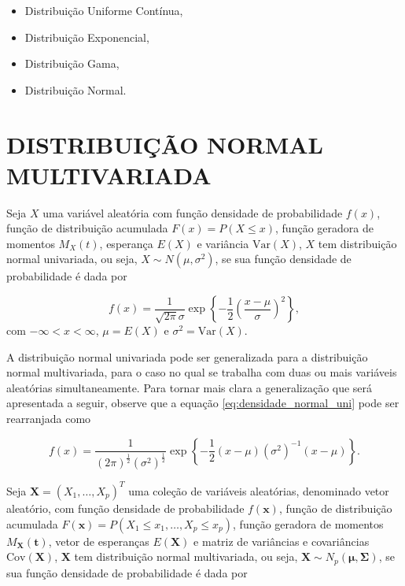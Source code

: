 \begin{itemize}
    \item Distribuição Uniforme Contínua,
    \item Distribuição Exponencial,
    \item Distribuição Gama,
    \item Distribuição Normal.
\end{itemize}

\chapter{DISTRIBUIÇÃO NORMAL MULTIVARIADA}

Seja $X$ uma variável aleatória com função densidade de probabilidade $f(x)$, função de distribuição acumulada $F(x) = P(X \leq x)$, função geradora de momentos $M_X(t)$, esperança $E(X)$ e variância $\mathrm{Var}(X)$, $X$ tem distribuição normal univariada, ou seja, $X \sim N(\mu, \sigma^2)$, se sua função densidade de probabilidade é dada por

\begin{equation} \label{eq:densidade_normal_uni}
f(x) = \dfrac{1}{\sqrt{2\pi}\sigma} \exp \left\{-\frac{1}{2} \left(\frac{x - \mu}{\sigma} \right)^2 \right\}, 
\end{equation} com $-\infty < x < \infty$, $\mu = E(X)$ e $\sigma^2 = \mathrm{Var}(X)$. 

A distribuição normal univariada pode ser generalizada para a distribuição normal multivariada, para o caso no qual se trabalha com duas ou mais variáveis aleatórias simultaneamente. Para tornar mais clara a generalização que será apresentada a seguir, observe que a equação \ref{eq:densidade_normal_uni} pode ser rearranjada como

\begin{equation} \label{eq:densidade_normal_uni2}
f(x) = \dfrac{1}{(2\pi)^{\frac{1}{2}} (\sigma^2)^{\frac{1}{2}}} \exp \left\{-\frac{1}{2} (x - \mu)(\sigma^2)^{-1}(x - \mu) \right\}.
\end{equation}

Seja $\mathbf{X} = (X_1,\ldots, X_p)^T$ uma coleção de variáveis aleatórias, denominado vetor aleatório, com função densidade de probabilidade $f(\mathbf{x})$, função de distribuição acumulada $F(\mathbf{x}) = P(X_1 \leq x_1, \ldots, X_p \leq x_p)$, função geradora de momentos $M_{\mathbf{X}}(\mathbf{t})$, vetor de esperanças $E(\mathbf{X})$ e matriz de variâncias e covariâncias $\mathrm{Cov}(\mathbf{X})$, $\mathbf{X}$ tem distribuição normal multivariada, ou seja, $\mathbf{X} \sim N_p(\mathbf{\mu}, \mathbf{\Sigma})$, se sua função densidade de probabilidade é dada por

